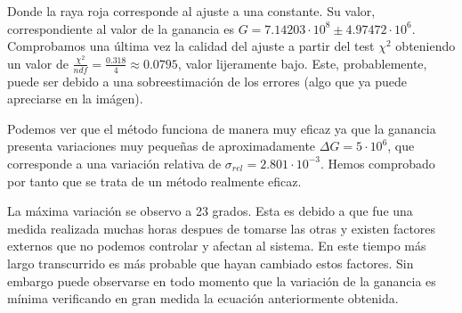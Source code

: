 Donde la raya roja corresponde al ajuste a una constante. Su valor, correspondiente al valor de la ganancia es $G=7.14203 \cdot 10^8 \pm 4.97472 \cdot 10^6$. Comprobamos una última vez la calidad del ajuste a partir del test $\chi^2$ obteniendo un valor de $\frac{\chi^2}{ndf}=\frac{0.318}{4}\approx 0.0795$, valor lijeramente bajo. Este, probablemente, puede ser debido a una sobreestimación de los errores (algo que ya puede apreciarse en la imágen).

Podemos ver que el método funciona de manera muy eficaz ya que la ganancia presenta variaciones muy pequeñas de aproximadamente $\Delta G=5 \cdot 10^6$, que corresponde a una variación relativa de $\sigma_{rel}=2.801 \cdot 10^{-3} $. Hemos comprobado por tanto que se trata de un método realmente eficaz.

La máxima variación se observo a 23 grados. Esta es debido a que fue una medida realizada muchas horas despues de tomarse las otras y existen factores externos que no podemos controlar y afectan al sistema. En este tiempo más largo transcurrido es más probable que hayan cambiado estos factores. Sin embargo puede observarse en todo momento que la variación de la ganancia es mínima verificando en gran medida la ecuación anteriormente obtenida.

